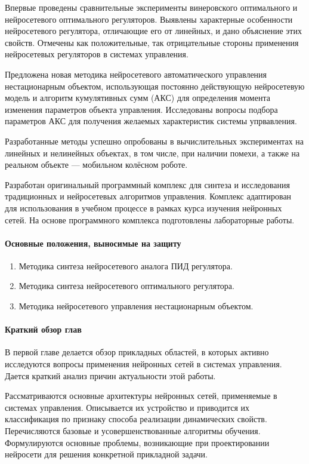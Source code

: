Впервые проведены сравнительные эксперименты винеровского оптимального
и нейросетевого оптимального регуляторов.  Выявлены характерные
особенности нейросетевого регулятора, отличающие его от линейных, и
дано объяснение этих свойств.  Отмечены как положительные, так
отрицательные стороны применения нейросетевых регуляторов в системах
управления.

Предложена новая методика нейросетевого автоматического управления
нестационарным объектом, использующая постоянно действующую
нейросетевую модель и алгоритм кумулятивных сумм (АКС) для определения
момента изменения параметров объекта управления.  Исследованы вопросы
подбора параметров АКС для получения желаемых характеристик системы
упрвавления.

Разработанные методы успешно опробованы в вычислительных экспериментах
на линейных и нелинейных объектах, в том числе, при наличии помехи, а
также на реальном объекте --- мобильном колёсном роботе.

Разработан оригинальный программный комплекс для синтеза и
исследования традиционных и нейросетевых алгоритмов управления.
Комплекс адаптирован для использования в учебном процессе в рамках
курса изучения нейронных сетей.  На основе программного комплекса
подготовлены лабораторные работы.

\paragraph{Основные положения, выносимые на защиту}

\begin{enumerate}
\item Методика синтеза нейросетевого аналога ПИД регулятора.
\item Методика синтеза нейросетевого оптимального регулятора.
\item Методика нейросетевого управления нестационарным объектом.
\end{enumerate}

\paragraph{Краткий обзор глав}


В первой главе делается обзор прикладных областей, в которых активно
исследуются вопросы применения нейронных сетей в системах управления.
Дается краткий анализ причин актуальности этой работы.

Рассматриваются основные архитектуры нейронных сетей, применяемые в
системах управления.  Описывается их устройство и приводится их
классификация по признаку способа реализации динамических свойств.
Перечисляются базовые и усовершенствованные алгоритмы обучения.
Формулируются основные проблемы, возникающие при проектировании
нейросети для решения конкретной прикладной задачи.

